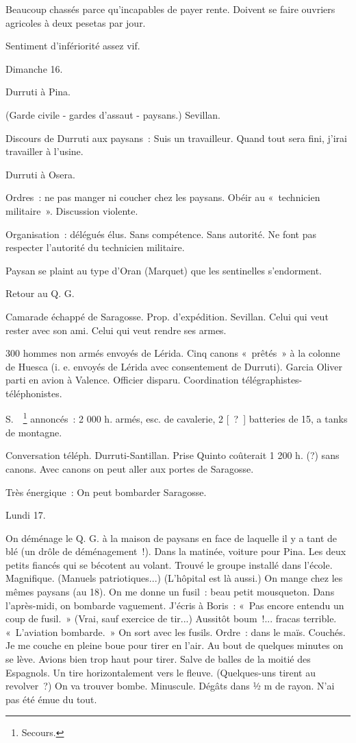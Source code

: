 \documentclass[french,twoside]{book} %
\begin{document}
Beaucoup chassés parce qu'incapables de payer rente. Doivent se faire ouvriers agricoles à deux pesetas par jour.\par
Sentiment d'infériorité assez vif.\par
Dimanche 16.\par
Durruti à Pina.\par
(Garde civile - gardes d'assaut - paysans.) Sevillan.\par
Discours de Durruti aux paysans : Suis un travailleur. Quand tout sera fini, j'irai travailler à l'usine.\par
Durruti à Osera.\par
Ordres : ne pas manger ni coucher chez les paysans. Obéir au « technicien militaire ». Discussion violente.\par
Organisation : délégués élus. Sans compétence. Sans autorité. Ne font pas respecter l'autorité du technicien militaire.\par
Paysan se plaint au type d'Oran (Marquet) que les sentinelles s'endorment.\par
Retour au Q. G.\par
Camarade échappé de Saragosse. Prop. d'expédition. Sevillan. Celui qui veut rester avec son ami. Celui qui veut rendre ses armes.\par
300 hommes non armés envoyés de Lérida. Cinq canons « prêtés » à la colonne de Huesca (i. e. envoyés de Lérida avec consentement de Durruti). Garcia Oliver parti en avion à Valence. Officier disparu. Coordination télé­graphistes-téléphonistes.\par
S.  \footnote{Secours.} annoncés : 2 000 h. armés, esc. de cavalerie, 2 [ ? ] batteries de 15, a tanks de montagne.\par
Conversation téléph. Durruti-Santillan. Prise Quinto coûterait 1 200 h. (?) sans canons. Avec canons on peut aller aux portes de Saragosse.\par
Très énergique : On peut bombarder Saragosse.\par
[Vx type : « Si, Señor... »]\par
Lundi 17.\par
On déménage le Q. G. à la maison de paysans en face de laquelle il y a tant de blé (un drôle de déménagement !). Dans la matinée, voiture pour Pina. Les deux petits fiancés qui se bécotent au volant. Trouvé le groupe installé dans l'école. Magnifique. (Manuels patriotiques...) (L'hôpital est là aussi.) On mange chez les mêmes paysans (au 18). On me donne un fusil : beau petit mousqueton. Dans l'après-midi, on bombarde vaguement. J'écris à Boris : « Pas encore entendu un coup de fusil. » (Vrai, sauf exercice de tir...) Aussitôt boum !... fracas terrible. « L'aviation bombarde. » On sort avec les fusils. Ordre : dans le maïs. Couchés. Je me couche en pleine boue pour tirer en l'air. Au bout de quelques minutes on se lève. Avions bien trop haut pour tirer. Salve de balles de la moitié des Espagnols. Un tire horizontalement vers le fleuve. (Quelques-uns tirent au revolver ?) On va trouver bombe. Minuscule. Dégâts dans ½ m de rayon. N'ai pas été émue du tout.\par
\end{document}
